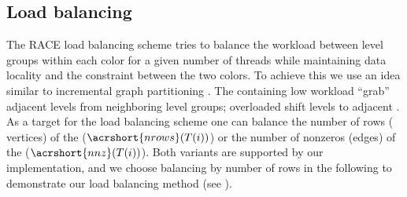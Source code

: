 \subsection{Load balancing}\label{subsec:LB} 
The RACE load balancing scheme tries to balance the workload between level
groups within each color for a given number of threads while maintaining data
locality and the \DK constraint between the two colors. To achieve this we use
an idea similar to incremental graph partitioning \cite{load_balancing}.  The
\levelGroups containing low workload ``grab'' adjacent levels from neighboring
level groups; overloaded \levelGroups shift levels to adjacent \levelGroups.  As
a target for the load balancing scheme one can balance the number of rows (\ie
vertices) of the \levelGroups ($\acrshort{nrows}(T(i))$) or the number of
nonzeros (\ie edges) of the \levelGroups ($\acrshort{nnz}(T(i))$). Both variants
are supported by our implementation, and we choose balancing by number of
rows in the following to demonstrate our load balancing method (see
).
 
